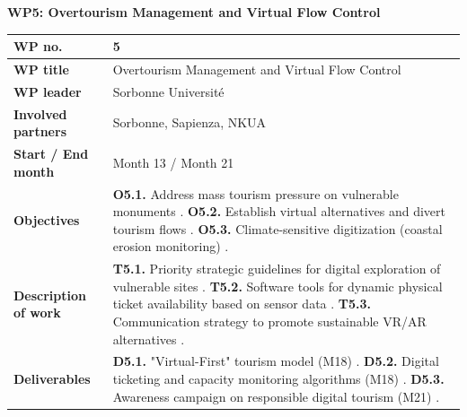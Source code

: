 \textbf{WP5: Overtourism Management and Virtual Flow Control}

\begin{table}[H]
\centering
\small
\renewcommand{\arraystretch}{1.2}
\begin{tabularx}{\textwidth}{|l|X|}
\hline
\rowcolor{gray!10} \textbf{WP no.} & 5 \\ \hline
\textbf{WP title} & Overtourism Management and Virtual Flow Control  \\ \hline
\textbf{WP leader} & Sorbonne Université  \\ \hline
\textbf{Involved partners} & Sorbonne, Sapienza, NKUA  \\ \hline
\textbf{Start / End month} & Month 13 / Month 21  \\ \hline
\textbf{Objectives} & \textbf{O5.1.} Address mass tourism pressure on vulnerable monuments . \newline \textbf{O5.2.} Establish virtual alternatives and divert tourism flows . \newline \textbf{O5.3.} Climate-sensitive digitization (coastal erosion monitoring) . \\ \hline
\textbf{Description of work} & \textbf{T5.1.} Priority strategic guidelines for digital exploration of vulnerable sites . \newline \textbf{T5.2.} Software tools for dynamic physical ticket availability based on sensor data . \newline \textbf{T5.3.} Communication strategy to promote sustainable VR/AR alternatives . \\ \hline
\textbf{Deliverables} & \textbf{D5.1.} "Virtual-First" tourism model (M18) . \newline \textbf{D5.2.} Digital ticketing and capacity monitoring algorithms (M18) . \newline \textbf{D5.3.} Awareness campaign on responsible digital tourism (M21) . \\ \hline
\end{tabularx}
\end{table}